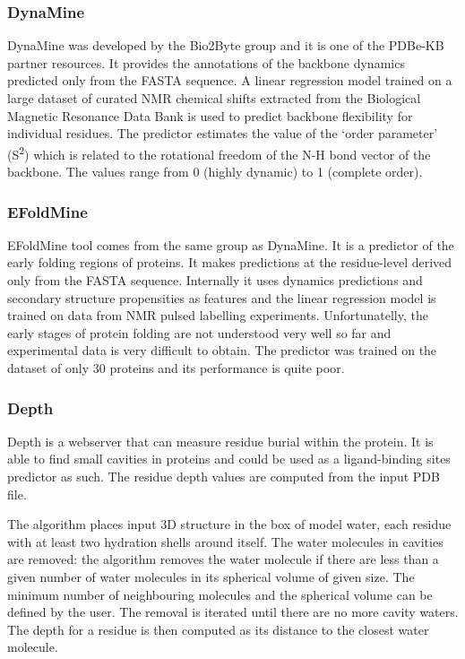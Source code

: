 \subsubsection{DynaMine}
DynaMine \cite{dynamine} was developed by the Bio2Byte group \cite{bio2byte} and it is one of the PDBe-KB partner resources. It provides the annotations of the backbone dynamics predicted only from the FASTA sequence. A linear regression model trained on a large dataset of curated NMR chemical shifts extracted from the Biological Magnetic Resonance Data Bank \cite{bmrb} is used to predict backbone flexibility for individual residues. The predictor estimates the value of the `order parameter' (S\textsuperscript{2}) which is related to the rotational freedom of the N-H bond vector of the backbone. The values range from 0 (highly dynamic) to 1 (complete order).

\subsubsection{EFoldMine}
EFoldMine \cite{efoldmine} tool comes from the same group as DynaMine. It is a predictor of the early folding regions of proteins. It makes predictions at the residue-level derived only from the FASTA sequence. Internally it uses dynamics predictions and secondary structure propensities as features and the linear regression model is trained on data from NMR pulsed labelling experiments. Unfortunatelly, the early stages of protein folding are not understood very well so far and experimental data is very difficult to obtain. The predictor was trained on the dataset of only 30 proteins and its performance is quite poor.

\subsubsection{Depth}
Depth \cite{depth} is a webserver that can measure residue burial within the protein. It is able to find small cavities in proteins and could be used as a ligand-binding sites predictor as such. The residue depth values are computed from the input PDB file.

The algorithm places input 3D structure in the box of model water, each residue with at least two hydration shells around itself. The water molecules in cavities are removed: the algorithm removes the water molecule if there are less than a given number of water molecules in its spherical volume of given size. The minimum number of neighbouring molecules and the spherical volume can be defined by the user. The removal is iterated until there are no more cavity waters. The depth for a residue is then computed as its distance to the closest water molecule.


